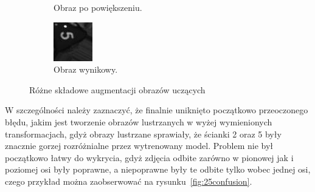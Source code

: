 \begin{figure}[h]
\begin{subfigure}[t]{0.32\linewidth}
        \caption{Obraz po powiększeniu.}
        \label{fig:5zoom}
    \end{subfigure}
    \hfill
    \begin{subfigure}[t]{0.32\linewidth}
        \centering
        \includegraphics[width=\linewidth]{chapters/04-czytanie/figures/combined_1}
        \caption{Obraz wynikowy.}
        \label{fig:5combined}
    \end{subfigure}

    \caption{Różne składowe augmentacji obrazów uczących}
    \label{fig:5augment}
\end{figure}


W szczególności należy zaznaczyć, że finalnie uniknięto początkowo przeoczonego błędu,
jakim jest tworzenie obrazów lustrzanych w wyżej wymienionych transformacjach, gdyż obrazy lustrzane
sprawiały, że ścianki 2 oraz 5 były znacznie gorzej rozróżnialne przez wytrenowany model.
Problem nie był początkowo łatwy do wykrycia, gdyż zdjęcia odbite zarówno w pionowej jak i poziomej osi były poprawne,
a niepoprawne były te odbite tylko wobec jednej osi, czego przykład można zaobserwować na rysunku~\ref{fig:25confusion}.


